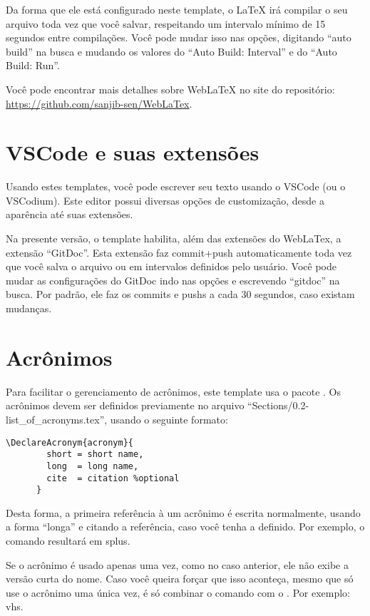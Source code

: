     Da forma que ele está configurado neste template, o \LaTeX{} irá compilar o seu arquivo toda vez que você salvar, respeitando um intervalo mínimo de 15 segundos entre compilações. Você pode mudar isso nas opções, digitando ``auto build'' na busca e mudando os valores do ``Auto Build: Interval'' e do ``Auto Build: Run''.

    Você pode encontrar mais detalhes sobre Web\LaTeX{} no site do repositório: \url{https://github.com/sanjib-sen/WebLaTex}.

  \section{VSCode e suas extensões}
    Usando estes templates, você pode escrever seu texto usando o VSCode (ou o VSCodium). Este editor possui diversas opções de customização, desde a aparência até suas extensões.

    Na presente versão, o template habilita, além das extensões do WebLaTex, a extensão ``GitDoc''. Esta extensão faz commit+push automaticamente toda vez que você salva o arquivo ou em intervalos definidos pelo usuário. Você pode mudar as configurações do GitDoc indo nas opções e escrevendo ``gitdoc'' na busca. Por padrão, ele faz os commits e pushs a cada 30 segundos, caso existam mudanças.

  \section{Acrônimos}
    Para facilitar o gerenciamento de acrônimos, este template usa o pacote . Os acrônimos devem ser definidos previamente no arquivo ``Sections/0.2-list\_of\_acronyms.tex'', usando o seguinte formato:
    \begin{lstlisting}[autogobble]
      \DeclareAcronym{acronym}{
        short = short name,
        long  = long name,
        cite  = citation %optional
      }
    \end{lstlisting}

    Desta forma, a primeira referência à um acrônimo é escrita normalmente, usando a forma ``longa'' e citando a referência, caso você tenha a definido. Por exemplo, o comando  resultará em \ac{splus}.

    Se o acrônimo é usado apenas uma vez, como no caso anterior, ele não exibe a versão curta do nome. Caso você queira forçar que isso aconteça, mesmo que só use o acrônimo uma única vez, é só combinar o comando  com o . Por exemplo: \ac{vhs}.

